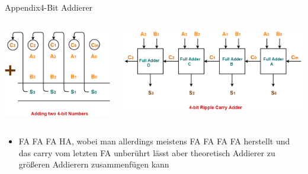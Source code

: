 \begin{frame}[allowframebreaks]{Appendix}{4-Bit Addierer}
  \begin{columns}
    \begin{column}{0.3\textwidth}
      \includegraphics[width=\textwidth, center]{./figures/addition.png}
    \end{column}
    \begin{column}{0.7\textwidth}
      \includegraphics[width=\textwidth, center]{./figures/4_adder_substractor.png}
    \end{column}
  \end{columns}
  \begin{itemize}
    \item FA FA FA HA, wobei man allerdings meistens FA FA FA FA herstellt und das carry vom letzten FA unberührt lässt aber theoretisch Addierer zu größeren Addierern zusammenfügen kann
  \end{itemize}
\end{frame}
